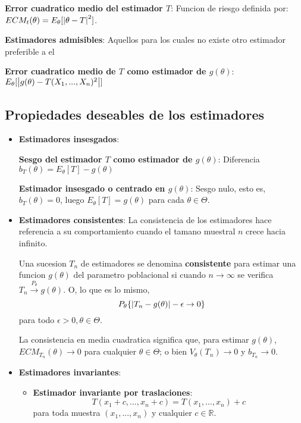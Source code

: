 \documentclass[10pt]{extarticle}
\newcommand{\R}{\mathbb{R}}
\newcommand{\<}{\langle}
\renewcommand{\>}{\rangle}
\theoremstyle{definition}
\begin{document}
\textbf{Error cuadratico medio del estimador $T$}: Funcion de riesgo definida por: $ECM_t(\theta) = E_\theta[\abs{\theta-T}^2]$.

\textbf{Estimadores admisibles}: Aquellos para los cuales no existe otro estimador preferible a el

\textbf{Error cuadratico medio de $T$ como estimador de $g(\theta)$}: $E_\theta[\abs{g(\theta) - T(X_1,...,X_n)^2}]$

\subsection*{Propiedades deseables de los estimadores}


\begin{itemize}
  \item \textbf{Estimadores insesgados}:

        \textbf{Sesgo del estimador $T$ como estimador de $g(\theta)$}: Diferencia $b_T(\theta)=E_\theta[T]-g(\theta)$

        \textbf{Estimador insesgado o centrado en $g(\theta)$}: Sesgo nulo, esto es, $b_T(\theta) = 0$, luego $E_\theta[T] = g(\theta)$ para cada $\theta \in \Theta$.

  \item \textbf{Estimadores consistentes}: La consistencia de los estimadores hace referencia a su comportamiento cuando el tamano muestral $n$ crece hacia infinito.

        Una sucesion $T_n$ de estimadores se denomina \textbf{consistente} para estimar una funcion $g(\theta)$ del parametro poblacional si cuando $n \to \infty$ se verifica $T_n \xrightarrow{P_\theta} g(\theta)$. O, lo que es lo mismo,
        \begin{equation*}
          P_\theta \{ \abs{T_n-g(\theta)} - \epsilon \rightarrow 0 \}
        \end{equation*}
        para todo $\epsilon > 0, \theta \in \Theta$.

        La consistencia en media cuadratica significa que, para estimar $g(\theta)$, $ECM_{T_n}(\theta) \rightarrow 0$ para cualquier $\theta \in \Theta$; o bien $V_\theta(T_n)\rightarrow 0$ y $b_{T_n} \rightarrow 0$.
        \newpage

  \item \textbf{Estimadores invariantes}:
        \begin{itemize}
          \item \textbf{Estimador invariante por traslaciones}:
                \begin{equation*}
                  T(x_1+c, ..., x_n+c)=T(x_1,..., x_n) + c
                \end{equation*}
                para toda muestra $(x_1, ..., x_n)$ y cualquier $c \in \R$.


\end{itemize}
\end{itemize}
\end{document}
